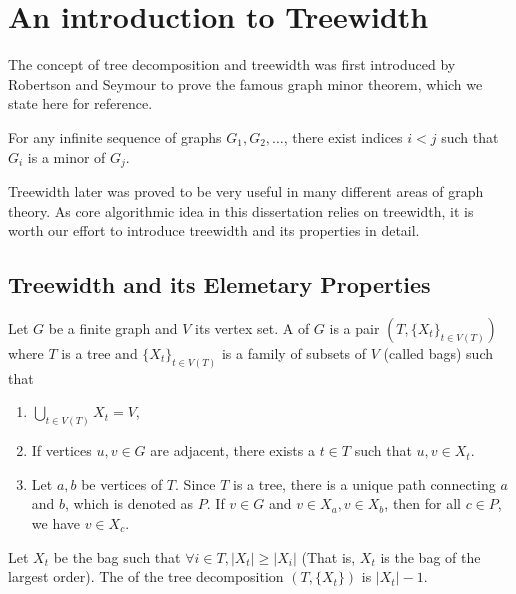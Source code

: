 \chapter{An introduction to Treewidth} \label{ch:treewidth}

The concept of tree decomposition and treewidth was first introduced by Robertson and Seymour to prove the famous graph minor theorem, which we state here for reference. 

\begin{theorem}
	For any infinite sequence of graphs $G_1, G_2, \ldots$, there exist indices $i < j$ such that $G_i$ is a minor of $G_j$.
\end{theorem}

Treewidth later was proved to be very useful in many different areas of graph theory. 
As core algorithmic idea in this dissertation relies on treewidth, it is worth our effort to introduce treewidth and its properties in detail.

\section{Treewidth and its Elemetary Properties}

\begin{definition}
	Let $G$ be a finite graph and $V$ its vertex set. A  of $G$ is a pair $(T, \{X_t\}_{t \in V(T)})$ where $T$ is a tree and $\{X_t\}_{t \in V(T)}$ is a family of subsets of $V$ (called bags) such that
	\begin{enumerate}
		\item $\bigcup_{t \in V(T)} X_t = V$,
		\item If vertices $u, v \in G$ are adjacent, there exists a $t \in T$  such that $u, v \in X_t$.
		\item Let $a, b$ be vertices of $T$. Since $T$ is a tree, there is a unique path connecting $a$ and $b$, which is denoted as $P$. If $v \in G$ and $v \in X_a, v \in X_b$, then for all $c \in P$, we have $v \in X_c$.
	\end{enumerate}

	Let $X_t$ be the bag such that $ \forall i \in T, |X_t| \geq |X_i|$ (That is, $X_t$ is the bag of the largest order). The  of the tree decomposition $(T, \{X_t\})$ is $|X_t| - 1$.
\end{definition}

